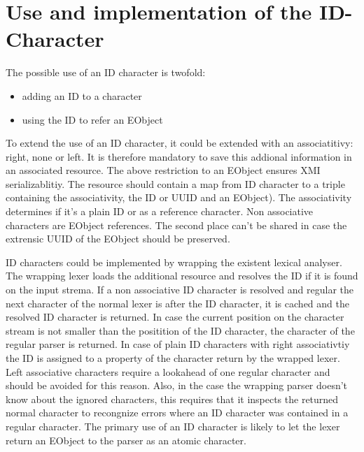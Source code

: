 \section{Use and implementation of the ID-Character}
The possible use of an ID character is twofold:
\begin{itemize}
	\item adding an ID to a character
	\item using the ID to refer an EObject
\end{itemize}
To extend the use of an ID character, it could be extended with an associatitivy: right, none or left.
It is therefore mandatory to save this addional information in an associated resource. The above restriction to an EObject ensures XMI serializablitiy. The resource should contain a map from ID character to a triple containing the associativity, the ID or UUID and an EObject). The associativity determines if it's a plain ID or as a reference character. Non associative characters are EObject references. The second place can't be shared in case the extrensic UUID of the EObject should be preserved.

ID characters could be implemented by wrapping the existent lexical analyser. The wrapping lexer loads the additional resource and resolves the ID if it is found on the input strema. If a non associative ID character is resolved and regular the next character of the normal lexer is after the ID character, it is cached and the resolved ID character is returned. In case the current position on the character stream is not smaller than the positition of the ID character, the character of the regular parser is returned. In case of plain ID characters with right associativtiy the ID is assigned to a property of the character return by the wrapped lexer. Left associative characters require a lookahead of one regular character and should be avoided for this reason. Also, in the case the wrapping parser doesn't know about the ignored characters, this requires that it inspects the returned normal character to recongnize errors where an ID character was contained in a regular character. The primary use of an ID character is likely to let the lexer return an EObject to the parser as an atomic character.

